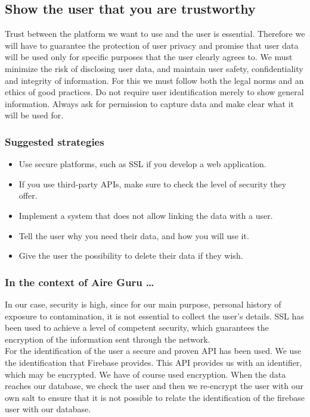 \subsection{Show the user that you are trustworthy}

Trust between the platform we want to use and the user is essential.
Therefore we will have to guarantee the protection of user privacy and promise that user data will be used only for specific purposes that the user clearly agrees to.
We must minimize the risk of disclosing user data, and maintain user safety, confidentiality and integrity of information.
For this we must follow both the legal norms and an ethics of good practices.
Do not require user identification merely to show general information.
Always ask for permission to capture data and make clear what it will be used for.

\subsubsection*{Suggested strategies} 

\begin{itemize}
    \item Use secure platforms, such as SSL if you develop a web application.
    \item If you use third-party APIs, make sure to check the level of security they offer.
    \item Implement a system that does not allow linking the data with a user.
    \item Tell the user why you need their data, and how you will use it.
    \item Give the user the possibility to delete their data if they wish.
\end{itemize}

\subsubsection*{In the context of Aire Guru \ldots} 

In our case, security is high, since for our main purpose, personal history
of exposure to contamination, it is not essential to collect the user's details.
SSL has been used to achieve a level of competent security, which guarantees the encryption of
the information sent through the network.\\

For the identification of the user a secure and proven API has been used. We use the identification
that Firebase provides. This API provides us with an identifier, which may be encrypted.
We have of course used encryption. When the data reaches our database,
we check the user and then we re-encrypt the user with our own salt to
ensure that it is not possible to relate the identification of the firebase user with our database. \\


